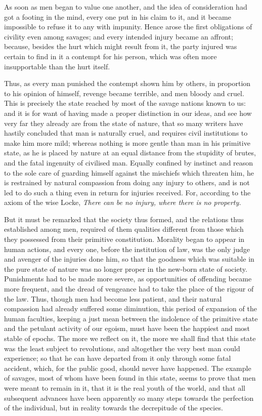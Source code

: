 \documentclass[12pt]{report}
\begin{document}
As soon as men began to value one another, and the idea of consideration had got a footing in the mind, every one put in his claim to it, and it became impossible to refuse it to any with impunity. Hence arose the first obligations of civility even among savages; and every intended injury became an affront; because, besides the hurt which might result from it, the party injured was certain to find in it a contempt for his person, which was often more insupportable than the hurt itself.

Thus, as every man punished the contempt shown him by others, in proportion to his opinion of himself, revenge became terrible, and men bloody and cruel. This is precisely the state reached by most of the savage nations known to us: and it is for want of having made a proper distinction in our ideas, and see how very far they already are from the state of nature, that so many writers have hastily concluded that man is naturally cruel, and requires civil institutions to make him more mild; whereas nothing is more gentle than man in his primitive state, as he is placed by nature at an equal distance from the stupidity of brutes, and the fatal ingenuity of civilised man. Equally confined by instinct and reason to the sole care of guarding himself against the mischiefs which threaten him, he is restrained by natural compassion from doing any injury to others, and is not led to do such a thing even in return for injuries received. For, according to the axiom of the wise Locke, \textit{There can be no injury, where there is no property.}

But it must be remarked that the society thus formed, and the relations thus established among men, required of them qualities different from those which they possessed from their primitive constitution. Morality began to appear in human actions, and every one, before the institution of law, was the only judge and avenger of the injuries done him, so that the goodness which was suitable in the pure state of nature was no longer proper in the new-born state of society. Punishments had to be made more severe, as opportunities of offending became more frequent, and the dread of vengeance had to take the place of the rigour of the law. Thus, though men had become less patient, and their natural compassion had already suffered some diminution, this period of expansion of the human faculties, keeping a just mean between the indolence of the primitive state and the petulant activity of our egoism, must have been the happiest and most stable of epochs. The more we reflect on it, the more we shall find that this state was the least subject to revolutions, and altogether the very best man could experience; so that he can have departed from it only through some fatal accident, which, for the public good, should never have happened. The example of savages, most of whom have been found in this state, seems to prove that men were meant to remain in it, that it is the real youth of the world, and that all subsequent advances have been apparently so many steps towards the perfection of the individual, but in reality towards the decrepitude of the species.
\end{document}
